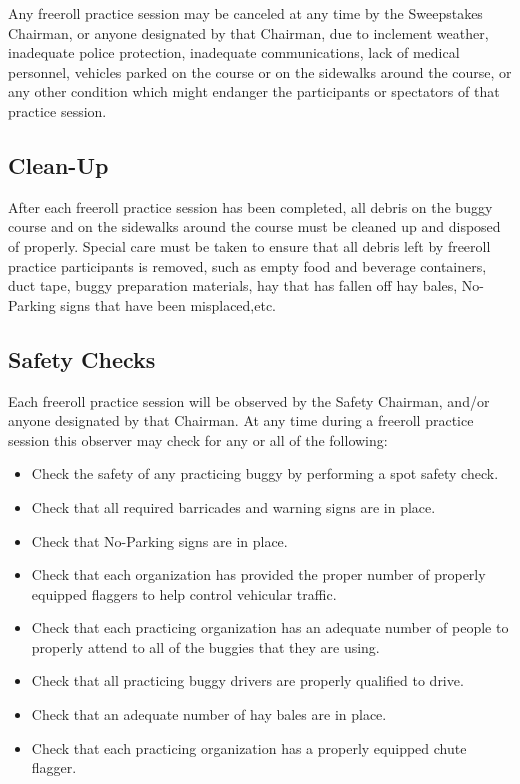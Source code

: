 \documentclass[openany]{book}
\begin{document}
Any freeroll practice session may be canceled at any time by the Sweepstakes Chairman, or anyone designated by that Chairman, due to inclement weather, inadequate police protection, inadequate communications, lack of medical personnel, vehicles parked on the course or on the sidewalks around the course, or any other condition which might endanger the participants or spectators of that practice session.

\subsection{Clean-Up}

After each freeroll practice session has been completed, all debris on the buggy course and on the sidewalks around the course must be cleaned up and disposed of properly. Special care must be taken to ensure that all debris left by freeroll practice participants is removed, such as empty food and beverage containers, duct tape, buggy preparation materials, hay that has fallen off hay bales, No-Parking signs that have been misplaced,etc.

\subsection{Safety Checks}

Each freeroll practice session will be observed by the Safety Chairman, and/or anyone designated by that Chairman. At any time during a freeroll practice session this observer may check for any or all of the following:
\begin{itemize}
	\item Check the safety of any practicing buggy by performing a spot safety check.
	\item Check that all required barricades and warning signs are in place.
	\item Check that No-Parking signs are in place.
	\item Check that each organization has provided the proper number of properly equipped flaggers to help control vehicular traffic.
	\item Check that each practicing organization has an adequate number of people to properly attend to all of the buggies that they are using.
	\item Check that all practicing buggy drivers are properly qualified to drive.
	\item Check that an adequate number of hay bales are in place.
	\item Check that each practicing organization has a properly equipped chute flagger.
\end{itemize}
\end{document}
